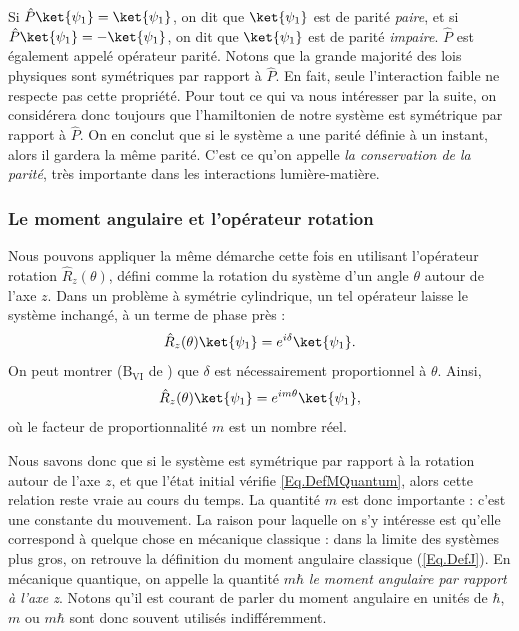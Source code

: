 Si $\hat{P}\ket{\psi_1}= \ket{\psi_1}$, on dit que $\ket{\psi_1}$ est de parité \textit{paire}, et si $\hat{P}\ket{\psi_1}= -\ket{\psi_1}$, on dit que $\ket{\psi_1}$ est de parité \textit{impaire}. $\hat{P}$ est également appelé opérateur parité. Notons que la grande majorité des lois physiques sont symétriques par rapport à $\hat{P}$. En fait, seule l'interaction faible ne respecte pas cette propriété. Pour tout ce qui va nous intéresser par la suite, on considérera donc toujours que l'hamiltonien de notre système est symétrique par rapport à $\hat{P}$. On en conclut que si le système a une parité définie à un instant, alors il gardera la même parité. C'est ce qu'on appelle \textit{la conservation de la parité}, très importante dans les interactions lumière-matière.

\subsubsection{Le moment angulaire et l'opérateur rotation}
Nous pouvons appliquer la même démarche cette fois en utilisant l'opérateur rotation $\hat{R}_z(\theta)$, défini comme la rotation du système d'un angle $\theta$ autour de l'axe $z$. Dans un problème à symétrie cylindrique, un tel opérateur laisse le système inchangé, à un terme de phase près :
\begin{equation*}
\hat{R}_z(\theta)\ket{\psi_1}=e^{i\delta}\ket{\psi_1}.
\end{equation*}
On peut montrer ($\text{B}_{\text{VI}}$ de ) que $\delta$ est nécessairement proportionnel à $\theta$. Ainsi,
\begin{equation}
\hat{R}_z(\theta)\ket{\psi_1}=e^{im\theta}\ket{\psi_1},
\label{Eq.DefMQuantum}
\end{equation}
où le facteur de proportionnalité $m$ est un nombre réel.

Nous savons donc que si le système est symétrique par rapport à la rotation autour de l'axe $z$, et que l'état initial vérifie \ref{Eq.DefMQuantum}, alors cette relation reste vraie au cours du temps. La quantité $m$ est donc importante : c'est une constante du mouvement. La raison pour laquelle on s'y intéresse est qu'elle correspond à quelque chose en mécanique classique : dans la limite des systèmes plus gros, on retrouve la définition du moment angulaire classique 
(\ref{Eq.DefJ}). En mécanique quantique, on appelle la quantité $m\hbar$ \textit{le moment angulaire par rapport à l'axe z}. Notons qu'il est courant de parler du moment angulaire en unités de $\hbar$, $m$ ou $m\hbar$ sont donc souvent utilisés indifféremment.

